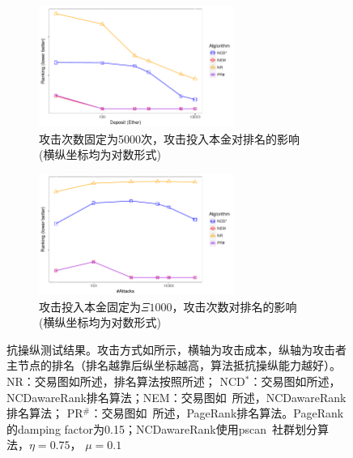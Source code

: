 \begin{figure}[!ht]
	\centering
	\begin{subfigure}{\linewidth}
		\centering
		\includegraphics[width=0.7\textwidth]{figs/AttackDeposit.pdf}
		\caption{攻击次数固定为5000次，攻击投入本金对排名的影响 \\ \footnotesize{(横纵坐标均为对数形式)}}
		\label{subfig:deposit}
	\end{subfigure}

	\begin{subfigure}{\linewidth}
	    \centering
		\includegraphics[width=0.7\textwidth]{figs/AttackTimes.pdf}
		\caption{攻击投入本金固定为$\Xi1000$，攻击次数对排名的影响  \\ \footnotesize{(横纵坐标均为对数形式)}}\label{subfig:times}
	\end{subfigure}

	\caption{抗操纵测试结果。攻击方式如所示，横轴为攻击成本，纵轴为攻击者主节点的排名（排名越靠后纵坐标越高，算法抵抗操纵能力越好）。NR：交易图如所述，排名算法按照所述；
	NCD$^*$：交易图如所述，NCDawareRank排名算法；NEM：交易图如~\cite{nem}所述，NCDawareRank排名算法； PR$^{\#}$：交易图如~\cite{nem}所述，PageRank排名算法。PageRank的damping factor为0.15；NCDawareRank使用pscan~\cite{chang2017mathsf}社群划分算法，$\eta=0.75$， $\mu=0.1$}
	\label{fig:antiManipulation}
\end{figure}

